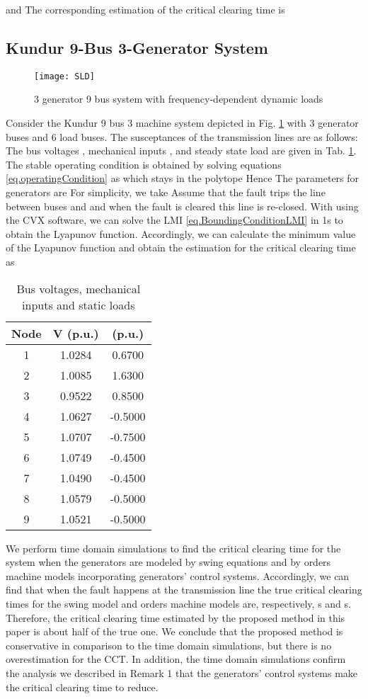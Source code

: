 \documentclass[final]{IEEEtran}
\begin{document}
   and  The corresponding estimation of the critical clearing time is 

\subsection{Kundur 9-Bus 3-Generator System}
\begin{figure}[t!]
\centering
\texttt{[image: SLD]}
\caption{3 generator 9 bus system with frequency-dependent dynamic
loads} \label{fig.3generator9bus}
\end{figure}

Consider the Kundur 9 bus 3 machine system depicted in Fig.
\ref{fig.3generator9bus}  with 3 generator buses and 6 load buses.
The susceptances of the transmission lines are as follows:
 The bus
voltages , mechanical inputs , and steady state load
 are given in Tab. \ref{tab.data9bus}. The stable
operating condition is obtained by solving equations
\eqref{eq.operatingCondition} as  which stays in the polytope  Hence  The parameters for generators are  For simplicity, we take  Assume that the fault trips the line between buses  and  and when the fault is cleared this line is re-closed. With  using the CVX software, we can solve the LMI
   \eqref{eq.BoundingConditionLMI} in 1s to obtain the Lyapunov function. Accordingly, we can calculate the minimum value of the Lyapunov function and obtain the estimation for the critical clearing time as 
\begin{table}[ht!]
\centering
\begin{tabular}{|c|c|c|}
  \hline
Node & V (p.u.) &  (p.u.) \\
  \hline
  1 & 1.0284 & 0.6700 \\
  2 & 1.0085 & 1.6300 \\
  3 & 0.9522 &  0.8500 \\
  4 & 1.0627 & -0.5000 \\
  5 & 1.0707 & -0.7500 \\
  6 & 1.0749 & -0.4500 \\
  7 & 1.0490 & -0.4500 \\
  8 & 1.0579 &  -0.5000 \\
  9 & 1.0521 &  -0.5000 \\
  \hline
\end{tabular}
\caption{Bus voltages, mechanical inputs and static
loads}\label{tab.data9bus}
\end{table}

We perform time domain simulations to find the critical clearing
time for the system when the generators are modeled by swing
equations and by  orders machine models incorporating
generators' control systems. Accordingly, we can find that when
the fault happens at the transmission line  the true
critical clearing times for the swing model and  orders
machine models are, respectively, s and s. Therefore,
the critical clearing time estimated by the proposed method in
this paper is about half of the true one. We conclude that the
proposed method is conservative in comparison to the time domain
simulations, but there is no overestimation for the CCT. In
addition, the time domain simulations confirm the analysis we
described in Remark 1 that the generators' control systems make
the critical clearing time to reduce.
\end{document}
